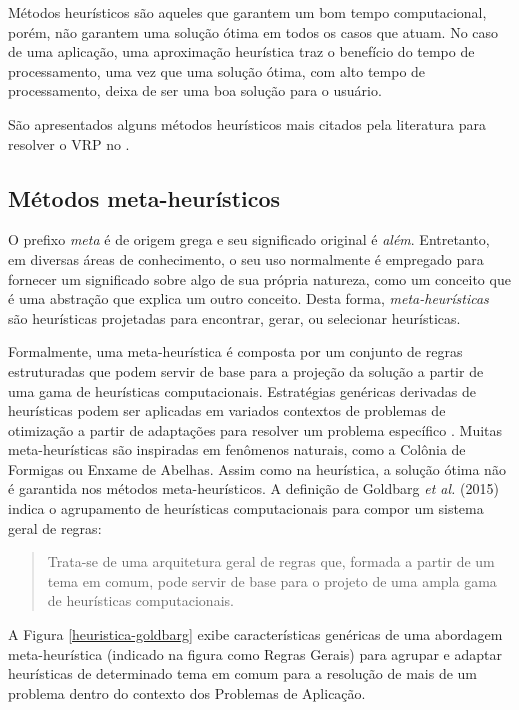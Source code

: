 Métodos heurísticos são aqueles que garantem um bom tempo computacional, porém, não garantem uma solução ótima em todos os casos que atuam. No caso de uma aplicação, uma aproximação heurística traz o benefício do tempo de processamento, uma vez que uma solução ótima, com alto tempo de processamento, deixa de ser uma boa solução para o usuário. 

São apresentados alguns métodos heurísticos mais citados pela literatura para resolver o VRP no .

\subsection{Métodos meta-heurísticos}\label{metaheuristica}
O prefixo \emph{meta} é de origem grega e seu significado original é \emph{além}. Entretanto, em diversas áreas de conhecimento, o seu uso normalmente é empregado para fornecer um significado sobre algo de sua própria natureza, como um conceito que é uma abstração que explica um outro conceito. Desta forma, \emph{meta-heurísticas} são heurísticas projetadas para encontrar, gerar, ou selecionar heurísticas.

Formalmente, uma meta-heurística é composta por um conjunto de regras estruturadas que podem servir de base para a projeção da solução a partir de uma gama de heurísticas computacionais. Estratégias genéricas derivadas de heurísticas  podem ser aplicadas em variados contextos de problemas de otimização a partir de adaptações para resolver um problema específico \cite{maxwell}. Muitas meta-heurísticas são inspiradas em fenômenos naturais, como a Colônia de Formigas ou Enxame de Abelhas. Assim como na heurística, a solução ótima não é garantida nos métodos meta-heurísticos. A definição de Goldbarg \emph{et al.} (2015) indica o agrupamento de heurísticas computacionais para compor um sistema geral de regras: 

\begin{quote}
Trata-se de uma arquitetura geral de regras que, formada a partir de um tema em comum, pode servir de base para o projeto de uma ampla gama de heurísticas computacionais.
\end{quote}

A Figura \ref{heuristica-goldbarg} exibe características genéricas de uma abordagem meta-heurística (indicado na figura como Regras Gerais) para agrupar e adaptar heurísticas de determinado tema em comum para a resolução de mais de um problema dentro do contexto dos Problemas de Aplicação.

